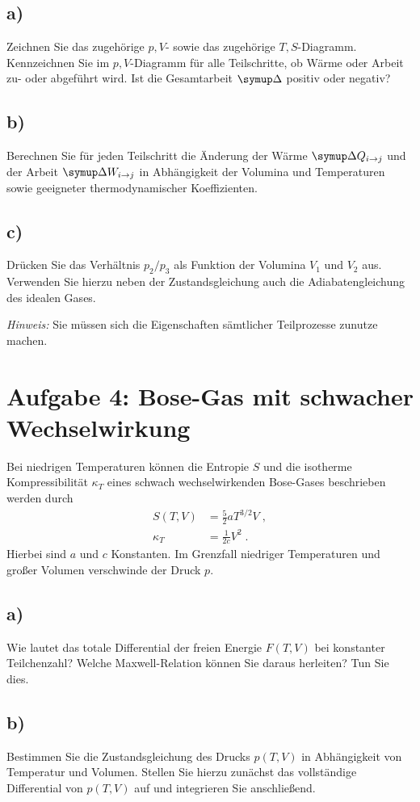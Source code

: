 \subsection{a)}
Zeichnen Sie das zugehörige $p,V$- sowie das zugehörige $T,S$-Diagramm.
Kennzeichnen Sie im $p,V$-Diagramm für alle Teilschritte, ob Wärme oder Arbeit zu- oder abgeführt wird.
Ist die Gesamtarbeit $\symup\Delta$ positiv oder negativ?

\subsection{b)}
Berechnen Sie für jeden Teilschritt die Änderung der Wärme $\symup\Delta Q_{i \to j}$ und der Arbeit $\symup\Delta W_{i \to j}$ in Abhängigkeit der Volumina und Temperaturen sowie geeigneter thermodynamischer Koeffizienten.

\subsection{c)}
Drücken Sie das Verhältnis $p_2 / p_3$ als Funktion der Volumina $V_1$ und $V_2$ aus.
Verwenden Sie hierzu neben der Zustandsgleichung auch die Adiabatengleichung des idealen Gases.

\textit{Hinweis:} Sie müssen sich die Eigenschaften sämtlicher Teilprozesse zunutze machen.

\section{Aufgabe 4: Bose-Gas mit schwacher Wechselwirkung}
Bei niedrigen Temperaturen können die Entropie $S$ und die isotherme Kompressibilität $\kappa_T$ eines schwach wechselwirkenden Bose-Gases beschrieben werden durch
\begin{align}
    S(T,V) &= \frac{5}{2}aT^{3/2}V \;, \\
    \kappa_T &= \frac{1}{2c}V^2 \;.
\end{align}
Hierbei sind $a$ und $c$ Konstanten. Im Grenzfall niedriger Temperaturen und großer Volumen verschwinde der Druck $p$.

\subsection{a)}
Wie lautet das totale Differential der freien Energie $F(T,V)$ bei konstanter Teilchenzahl?
Welche Maxwell-Relation können Sie daraus herleiten?
Tun Sie dies.

\subsection{b)}
Bestimmen Sie die Zustandsgleichung des Drucks $p(T,V)$ in Abhängigkeit von Temperatur und Volumen.
Stellen Sie hierzu zunächst das vollständige Differential von $p(T,V)$ auf und integrieren Sie anschließend.

